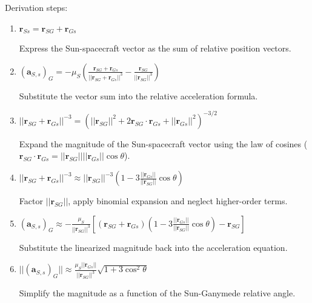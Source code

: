 \documentclass{report}
\begin{document}
Derivation steps:
\begin{enumerate}
    \item $\mathbf{r}_{Ss} = \mathbf{r}_{SG} + \mathbf{r}_{Gs}$
    
    {Express the Sun-spacecraft vector as the sum of relative position vectors.}\\
    \item $\left(\mathbf{a}_{S,s}\right)_{G} = -\mu_{S} \left( \frac{\mathbf{r}_{SG} + \mathbf{r}_{Gs}}{||\mathbf{r}_{SG} + \mathbf{r}_{Gs}||^3} - \frac{\mathbf{r}_{SG}}{||\mathbf{r}_{SG}||^3} \right)$
    
    {Substitute the vector sum into the relative acceleration formula.}\\
    \item $||\mathbf{r}_{SG} + \mathbf{r}_{Gs}||^{-3} = \left( ||\mathbf{r}_{SG}||^2 + 2\mathbf{r}_{SG} \cdot \mathbf{r}_{Gs} + ||\mathbf{r}_{Gs}||^2 \right)^{-3/2}$ 
    
    {Expand the magnitude of the Sun-spacecraft vector using the law of cosines ($ \mathbf{r}_{SG} \cdot \mathbf{r}_{Gs} = ||\mathbf{r}_{SG}|| ||\mathbf{r}_{Gs}|| \cos\theta $).}\\
    \item $||\mathbf{r}_{SG} + \mathbf{r}_{Gs}||^{-3} \approx ||\mathbf{r}_{SG}||^{-3} \left( 1 - 3 \frac{||\mathbf{r}_{Gs}||}{||\mathbf{r}_{SG}||} \cos\theta \right)$ 
    
    {Factor $||\mathbf{r}_{SG}||$, apply binomial expansion and neglect higher-order terms.}\\
    \item $\left(\mathbf{a}_{S,s}\right)_{G} \approx -\frac{\mu_{S}}{||\mathbf{r}_{SG}||^3} \left[ (\mathbf{r}_{SG} + \mathbf{r}_{Gs}) \left( 1 - 3 \frac{||\mathbf{r}_{Gs}||}{||\mathbf{r}_{SG}||} \cos\theta \right) - \mathbf{r}_{SG} \right]$ 
    
    {Substitute the linearized magnitude back into the acceleration equation.}\\
    \item $||\left(\mathbf{a}_{S,s}\right)_{G}|| \approx \frac{\mu_{S} ||\mathbf{r}_{Gs}||}{||\mathbf{r}_{SG}||^3} \sqrt{1 + 3\cos^2\theta}$ 
    
    {Simplify the magnitude as a function of the Sun-Ganymede relative angle.}\\
\end{enumerate}
\end{document}
